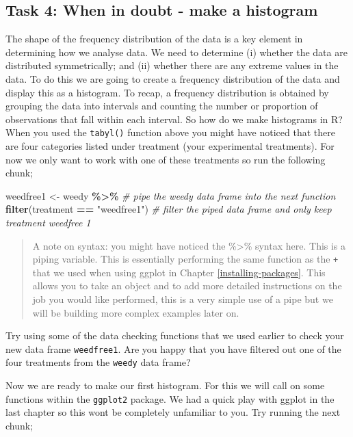 \documentclass[
]{book}
\newenvironment{Shaded}{\begin{snugshade}}{\end{snugshade}}
\newcommand{\CommentTok}[1]{\textcolor[rgb]{0.56,0.35,0.01}{\textit{#1}}}
\newcommand{\FunctionTok}[1]{\textcolor[rgb]{0.13,0.29,0.53}{\textbf{#1}}}
\newcommand{\NormalTok}[1]{#1}
\newcommand{\OtherTok}[1]{\textcolor[rgb]{0.56,0.35,0.01}{#1}}
\newcommand{\SpecialCharTok}[1]{\textcolor[rgb]{0.81,0.36,0.00}{\textbf{#1}}}
\newcommand{\StringTok}[1]{\textcolor[rgb]{0.31,0.60,0.02}{#1}}
\begin{document}
\hypertarget{histogram}{%
\subsection{Task 4: When in doubt - make a histogram}\label{histogram}}

The shape of the frequency distribution of the data is a key element in determining how we analyse data. We need to determine (i) whether the data are distributed symmetrically; and (ii) whether there are any extreme values in the data. To do this we are going to create a frequency distribution of the data and display this as a histogram. To recap, a frequency distribution is obtained by grouping the data into intervals and counting the number or proportion of observations that fall within each interval.
So how do we make histograms in R? When you used the \texttt{tabyl()} function above you might have noticed that there are four categories listed under treatment (your experimental treatments). For now we only want to work with one of these treatments so run the following chunk;

\begin{Shaded}
\begin{Highlighting}[]
\NormalTok{weedfree1 }\OtherTok{\textless{}{-}}\NormalTok{ weedy }\SpecialCharTok{\%\textgreater{}\%} \CommentTok{\# pipe the weedy data frame into the next function }
  \FunctionTok{filter}\NormalTok{(treatment }\SpecialCharTok{==} \StringTok{"weedfree1"}\NormalTok{) }\CommentTok{\# filter the piped data frame and only keep treatment weedfree 1}
\end{Highlighting}
\end{Shaded}

\begin{quote}
A note on syntax: you might have noticed the \%\textgreater\% syntax here. This is a piping variable. This is essentially performing the same function as the \texttt{+} that we used when using ggplot in Chapter \ref{installing-packages}. This allows you to take an object and to add more detailed instructions on the job you would like performed, this is a very simple use of a pipe but we will be building more complex examples later on.
\end{quote}

Try using some of the data checking functions that we used earlier to check your new data frame \texttt{weedfree1}. Are you happy that you have filtered out one of the four treatments from the \texttt{weedy} data frame?

Now we are ready to make our first histogram. For this we will call on some functions within the \texttt{ggplot2} package. We had a quick play with ggplot in the last chapter so this wont be completely unfamiliar to you. Try running the next chunk;
\end{document}
